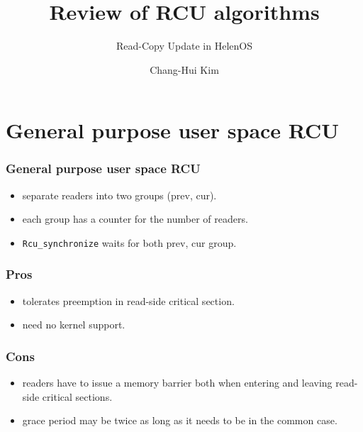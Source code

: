 \documentclass{beamer}
\title{Review of RCU algorithms}
\subtitle{Read-Copy Update in HelenOS}
\author{Chang-Hui Kim}
\begin{document}
\begin{frame}
  \titlepage
\end{frame}


\section{General purpose user space RCU}


\begin{frame}[t]
  \frametitle{General purpose user space RCU}

  \begin{itemize}
  \item separate readers into two groups (prev, cur).
  \item each group has a counter for the number of readers.
  \item \texttt{Rcu\_synchronize} waits for both prev, cur group.
  \end{itemize}
  
\end{frame}


\begin{frame}[t]
  \frametitle{Pros}

  \begin{itemize}
  \item tolerates preemption in read-side critical section.
  \item need no kernel support.
  \end{itemize}
  
\end{frame}


\begin{frame}[t]
  \frametitle{Cons}

  \begin{itemize}
  \item readers have to issue a memory barrier both when entering and leaving
    read-side critical sections.
  \item grace period may be twice as long as it needs to be in the common case. 
  \end{itemize}
  
\end{frame}
\end{document}
